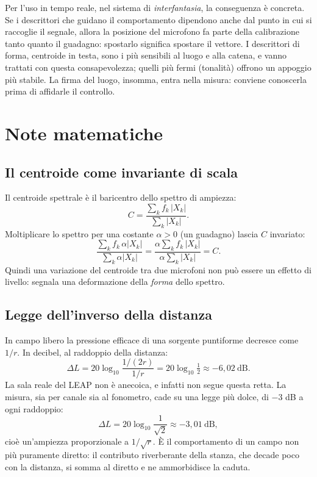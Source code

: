 \documentclass[11pt,a4paper]{article}
\begin{document}
Per l'uso in tempo reale, nel sistema di \emph{interfantasia}, la conseguenza è concreta. Se
i descrittori che guidano il comportamento dipendono anche dal punto in cui si raccoglie il
segnale, allora la posizione del microfono fa parte della calibrazione tanto quanto il
guadagno: spostarlo significa spostare il vettore. I descrittori di forma, centroide in testa,
sono i più sensibili al luogo e alla catena, e vanno trattati con questa consapevolezza;
quelli più fermi (tonalità) offrono un appoggio più stabile. La firma del luogo, insomma,
entra nella misura: conviene conoscerla prima di affidarle il controllo.

\appendix
\section{Note matematiche}
\subsection{Il centroide come invariante di scala}
Il centroide spettrale è il baricentro dello spettro di ampiezza:
\begin{equation}
  C = \frac{\sum_k f_k\, |X_k|}{\sum_k |X_k|}.
\end{equation}
Moltiplicare lo spettro per una costante $\alpha>0$ (un guadagno) lascia $C$ invariato:
\begin{equation}
  \frac{\sum_k f_k\, \alpha|X_k|}{\sum_k \alpha|X_k|}
  = \frac{\alpha \sum_k f_k\, |X_k|}{\alpha \sum_k |X_k|} = C.
\end{equation}
Quindi una variazione del centroide tra due microfoni non può essere un effetto di
livello: segnala una deformazione della \emph{forma} dello spettro.

\subsection{Legge dell'inverso della distanza}
In campo libero la pressione efficace di una sorgente puntiforme decresce come $1/r$.
In decibel, al raddoppio della distanza:
\begin{equation}
  \Delta L = 20\log_{10}\!\frac{1/(2r)}{1/r} = 20\log_{10}\tfrac{1}{2} \approx -6{,}02\ \text{dB}.
\end{equation}
La sala reale del LEAP non è anecoica, e infatti non segue questa retta. La misura, sia per
canale sia al fonometro, cade su una legge più dolce, di $-3$ dB a ogni raddoppio:
\begin{equation}
  \Delta L = 20\log_{10}\frac{1}{\sqrt{2}} \approx -3{,}01\ \text{dB},
\end{equation}
cioè un'ampiezza proporzionale a $1/\sqrt{r}$. È il comportamento di un campo non più
puramente diretto: il contributo riverberante della stanza, che decade poco con la distanza,
si somma al diretto e ne ammorbidisce la caduta.
\end{document}
